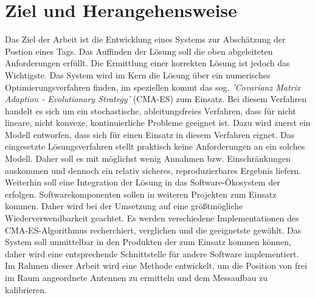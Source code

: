 \section{Ziel und Herangehensweise}
%
Das Ziel der Arbeit ist die Entwicklung eines Systems zur Abschätzung der Postion eines Tags. Das Auffinden der Lösung soll die oben abgeleiteten Anforderungen erfüllt. Die Ermittlung einer korrekten Lösung ist jedoch das Wichtigste. Das System wird im Kern die Lösung über ein numerisches Optimierungsverfahren finden, im speziellen kommt das sog. \textit{'Covarianz Matrix Adaption - Evolutionary Strategy'} (CMA-ES) zum Einsatz. Bei diesem Verfahren handelt es sich um ein stochastische, ableitungsfreies Verfahren, dass für nicht lineare, nicht konvexe, kontinuierliche Probleme geeignet ist. Dazu wird zuerst ein Modell entworfen, dass sich für einen Einsatz in diesem Verfahren eignet. Das eingesetzte Lösungsverfahren stellt praktisch keine Anforderungen an ein solches Modell. Daher soll es mit möglichst wenig Annahmen bzw. Einschränkungen auskommen und dennoch ein relativ sicheres, reproduzierbares Ergebnis liefern. Weiterhin soll eine Integration der Lösung in das Software-Ökosystem der \amedogmbh erfolgen. Softwarekomponenten sollen in weiteren Projekten zum Einsatz kommen. Daher wird bei der Umsetzung auf eine größtmögliche Wiederverwendbarkeit geachtet. Es werden verschiedene Implementationen des CMA-ES-Algorithmus recherchiert, verglichen und die geeignetste gewählt. Das System soll unmittelbar in den Produkten der \amedogmbh zum Einsatz kommen können, daher wird eine entsprechende Schnittstelle für andere Software implementiert. Im Rahmen dieser Arbeit wird eine Methode entwickelt, um die Position von frei im Raum angeordnete Antennen zu ermitteln und dem Messaufbau zu kalibrieren.
%
